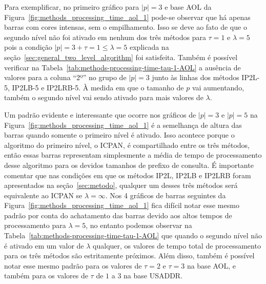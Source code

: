 Para exemplificar, no primeiro gráfico para $|p|=3$ e base AOL da Figura~\ref{fig:methods_processing_time_aol_1} pode-se observar que há apenas barras com cores intensas, sem o empilhamento. Isso se deve ao fato de que o segundo nível não foi ativado em nenhum dos três métodos para $\tau=1$ e $\lambda=5$ pois a condição $|p|=3 + \tau=1 \leq \lambda=5$ explicada na seção~\ref{sec:general_two_level_algorithm} foi satisfeita. Também é possível verificar na Tabela~\ref{tab:methods-processing-time-tau-1-AOL} a ausência de valores para a coluna  ``2º'' no grupo de $|p|=3$ junto às linhas dos métodos IP2L-5, IP2LB-5 e IP2LRB-5. À medida em que o tamanho de $p$ vai aumentando, também o segundo nível vai sendo ativado para mais valores de $\lambda$.

Um padrão evidente e interessante que ocorre nos gráficos de $|p|=3$ e $|p|=5$ na Figura~\ref{fig:methods_processing_time_aol_1} é a semelhança de altura das barras quando somente o primeiro nível é ativado. Isso acontece porque o algoritmo do primeiro nível, o ICPAN, é compartilhado entre os três métodos, então essas barras representam simplesmente a média de tempo de processamento desse algoritmo para os devidos tamanhos de prefixo de consulta. É importante comentar que nas condições em que os métodos IP2L, IP2LB e IP2LRB foram apresentados na seção~\ref{sec:metodo}, qualquer um desses três métodos será equivalente ao ICPAN se $\lambda=\infty$. Nos 4 gráficos de barras seguintes da Figura~\ref{fig:methods_processing_time_aol_1} fica difícil notar esse mesmo padrão por conta do achatamento das barras devido aos altos tempos de processamento para $\lambda=5$, no entanto podemos observar na Tabela~\ref{tab:methods-processing-time-tau-1-AOL} que quando o segundo nível não é ativado em um valor de $\lambda$ qualquer, os valores de tempo total de processamento para os três métodos são estritamente próximos. Além disso, também é possível notar esse mesmo padrão para os valores de $\tau=2$ e $\tau=3$ na base AOL, e também para os valores de $\tau$ de $1$ a $3$ na base USADDR.

